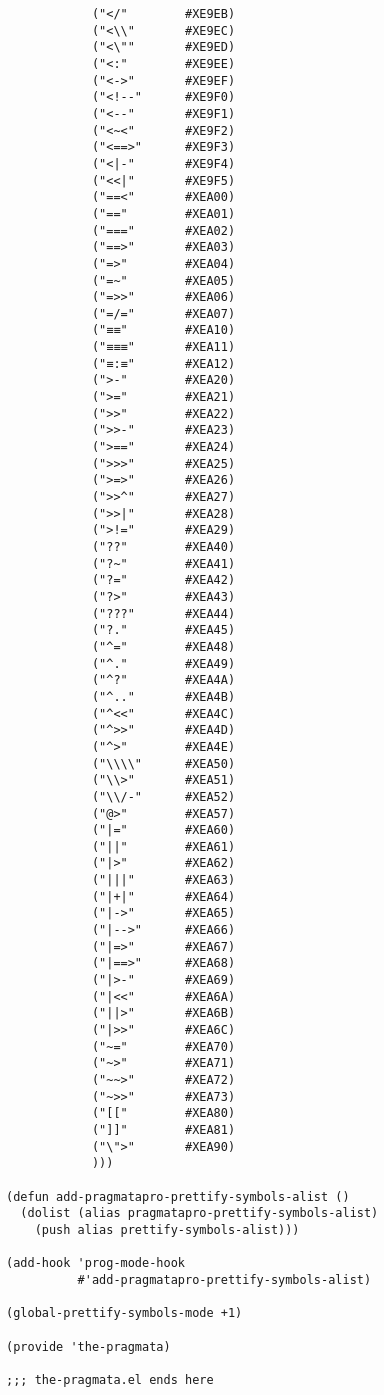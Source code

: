 \documentclass[11pt]{article}
\begin{document}
\begin{verbatim}
            ("</"        #XE9EB)
            ("<\\"       #XE9EC)
            ("<\""       #XE9ED)
            ("<:"        #XE9EE)
            ("<->"       #XE9EF)
            ("<!--"      #XE9F0)
            ("<--"       #XE9F1)
            ("<~<"       #XE9F2)
            ("<==>"      #XE9F3)
            ("<|-"       #XE9F4)
            ("<<|"       #XE9F5)
            ("==<"       #XEA00)
            ("=="        #XEA01)
            ("==="       #XEA02)
            ("==>"       #XEA03)
            ("=>"        #XEA04)
            ("=~"        #XEA05)
            ("=>>"       #XEA06)
            ("=/="       #XEA07)
            ("≡≡"        #XEA10)
            ("≡≡≡"       #XEA11)
            ("≡:≡"       #XEA12)
            (">-"        #XEA20)
            (">="        #XEA21)
            (">>"        #XEA22)
            (">>-"       #XEA23)
            (">=="       #XEA24)
            (">>>"       #XEA25)
            (">=>"       #XEA26)
            (">>^"       #XEA27)
            (">>|"       #XEA28)
            (">!="       #XEA29)
            ("??"        #XEA40)
            ("?~"        #XEA41)
            ("?="        #XEA42)
            ("?>"        #XEA43)
            ("???"       #XEA44)
            ("?."        #XEA45)
            ("^="        #XEA48)
            ("^."        #XEA49)
            ("^?"        #XEA4A)
            ("^.."       #XEA4B)
            ("^<<"       #XEA4C)
            ("^>>"       #XEA4D)
            ("^>"        #XEA4E)
            ("\\\\"      #XEA50)
            ("\\>"       #XEA51)
            ("\\/-"      #XEA52)
            ("@>"        #XEA57)
            ("|="        #XEA60)
            ("||"        #XEA61)
            ("|>"        #XEA62)
            ("|||"       #XEA63)
            ("|+|"       #XEA64)
            ("|->"       #XEA65)
            ("|-->"      #XEA66)
            ("|=>"       #XEA67)
            ("|==>"      #XEA68)
            ("|>-"       #XEA69)
            ("|<<"       #XEA6A)
            ("||>"       #XEA6B)
            ("|>>"       #XEA6C)
            ("~="        #XEA70)
            ("~>"        #XEA71)
            ("~~>"       #XEA72)
            ("~>>"       #XEA73)
            ("[["        #XEA80)
            ("]]"        #XEA81)
            ("\">"       #XEA90)
            )))

(defun add-pragmatapro-prettify-symbols-alist ()
  (dolist (alias pragmatapro-prettify-symbols-alist)
    (push alias prettify-symbols-alist)))

(add-hook 'prog-mode-hook
          #'add-pragmatapro-prettify-symbols-alist)

(global-prettify-symbols-mode +1)

(provide 'the-pragmata)

;;; the-pragmata.el ends here
\end{verbatim}
\end{document}
